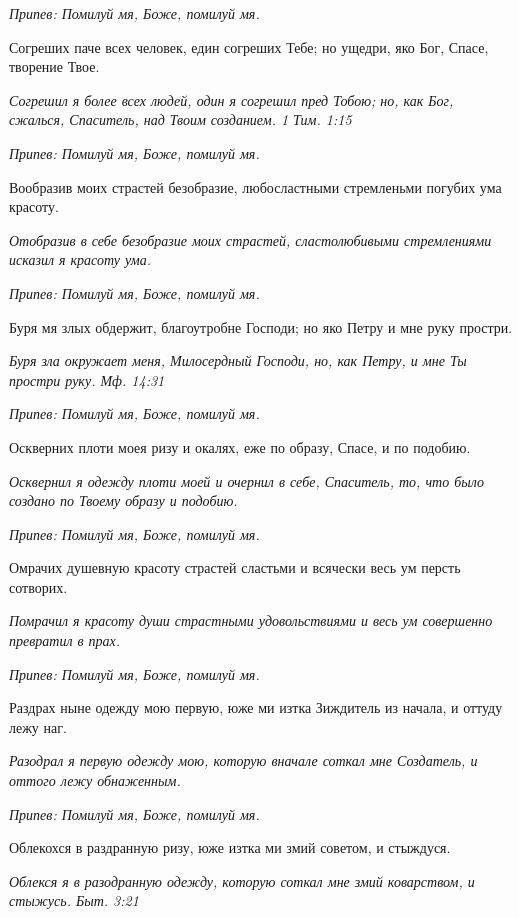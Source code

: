 \itshape Припев:\normalfont{} Помилуй мя, Боже, помилуй мя.


Согреших паче всех человек, един согреших Тебе; но ущедри, яко Бог, Спасе, творение Твое.


\itshape Согрешил я более всех людей, один я согрешил пред Тобою; но, как Бог, сжалься, Спаситель, над Твоим созданием. 1 Тим. 1:15\normalfont{}


\itshape Припев:\normalfont{} Помилуй мя, Боже, помилуй мя.


Вообразив моих страстей безобразие, любосластными стремленьми погубих ума красоту.


\itshape Отобразив в себе безобразие моих страстей, сластолюбивыми стремлениями исказил я красоту ума.\normalfont{}


\itshape Припев:\normalfont{} Помилуй мя, Боже, помилуй мя.


Буря мя злых обдержит, благоутробне Господи; но яко Петру и мне руку простри.


\itshape Буря зла окружает меня, Милосердный Господи, но, как Петру, и мне Ты простри руку. Мф. 14:31\normalfont{}


\itshape Припев:\normalfont{} Помилуй мя, Боже, помилуй мя.


Оскверних плоти моея ризу и окалях, еже по образу, Спасе, и по подобию.


\itshape Осквернил я одежду плоти моей и очернил в себе, Спаситель, то, что было создано по Твоему образу и подобию.\normalfont{}


\itshape Припев:\normalfont{} Помилуй мя, Боже, помилуй мя.


Омрачих душевную красоту страстей сластьми и всячески весь ум персть сотворих.


\itshape Помрачил я красоту души страстными удовольствиями и весь ум совершенно превратил в прах.\normalfont{}


\itshape Припев:\normalfont{} Помилуй мя, Боже, помилуй мя.


Раздрах ныне одежду мою первую, юже ми изтка Зиждитель из начала, и оттуду лежу наг.


\itshape Разодрал я первую одежду мою, которую вначале соткал мне Создатель, и оттого лежу обнаженным.\normalfont{}


\itshape Припев:\normalfont{} Помилуй мя, Боже, помилуй мя.


Облекохся в раздранную ризу, юже изтка ми змий советом, и стыждуся.


\itshape Облекся я в разодранную одежду, которую соткал мне змий коварством, и стыжусь. Быт. 3:21\normalfont{}


